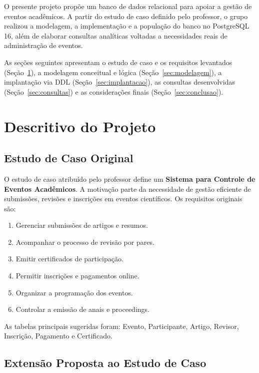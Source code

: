\documentclass[12pt]{article}
\begin{document}
O presente projeto propõe um banco de dados relacional para apoiar a gestão de eventos acadêmicos. A partir do estudo de caso definido pelo professor, o grupo realizou a modelagem, a implementação e a população do banco no PostgreSQL 16, além de elaborar consultas analíticas voltadas a necessidades reais de administração de eventos.

As seções seguintes apresentam o estudo de caso e os requisitos levantados (Seção~\ref{sec:descritivo}), a modelagem conceitual e lógica (Seção~\ref{sec:modelagem}), a implantação via DDL (Seção~\ref{sec:implantacao}), as consultas desenvolvidas (Seção~\ref{sec:consultas}) e as considerações finais (Seção~\ref{sec:conclusao}).

\section{Descritivo do Projeto}
\label{sec:descritivo}

\subsection{Estudo de Caso Original}
\label{subsec:caso-original}

O estudo de caso atribuído pelo professor define um \textbf{Sistema para Controle
de Eventos Acadêmicos}. A motivação parte da necessidade de gestão eficiente de
submissões, revisões e inscrições em eventos científicos. Os requisitos originais
são:

\begin{enumerate}
    \item Gerenciar submissões de artigos e resumos.
    \item Acompanhar o processo de revisão por pares.
    \item Emitir certificados de participação.
    \item Permitir inscrições e pagamentos online.
    \item Organizar a programação dos eventos.
    \item Controlar a emissão de anais e proceedings.
\end{enumerate}

As tabelas principais sugeridas foram: Evento, Participante, Artigo, Revisor,
Inscrição, Pagamento e Certificado.

\subsection{Extensão Proposta ao Estudo de Caso}
\label{subsec:caso-estendido}
\end{document}
